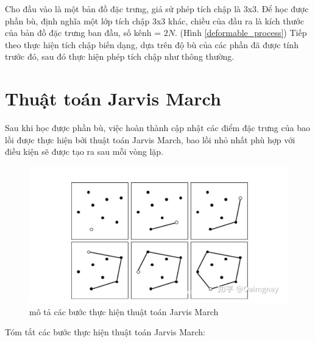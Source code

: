 \documentclass[12pt,a4paper,openany,oneside]{report}
\begin{document}
Cho đầu vào là một bản đồ đặc trưng, giả sử phép tích chập là 3x3. Để học được phần bù, định nghĩa một lớp tích chập 3x3 khác, chiều của đầu ra là kích thước của bản đồ đặc trưng ban đầu, số kênh = $2N$. (Hình \ref{deformable_process}) Tiếp theo thực hiện tích chập biến dạng, dựa trên độ bù của các phần đã được tính trước đó, sau đó thực hiện phép tích chập như thông thường.
\section{Thuật toán Jarvis March}
Sau khi học được phần bù, việc hoàn thành cập nhật các điểm đặc trưng của bao lồi được thực hiện bởi thuật toán Jarvis March, bao lồi nhỏ nhất phù hợp với điều kiện sẽ được tạo ra sau mỗi vòng lặp.

\begin{figure}[ht!]
	\begin{center}
		\includegraphics[width=435px]{./jarvis_march_steps.jpg}
		\caption{mô tả các bước thực hiện thuật toán Jarvis March}
		\label{fig_dhandang1}
	\end{center}
\end{figure} 
Tóm tắt các bước thực hiện thuật toán Jarvis March:
\end{document}
